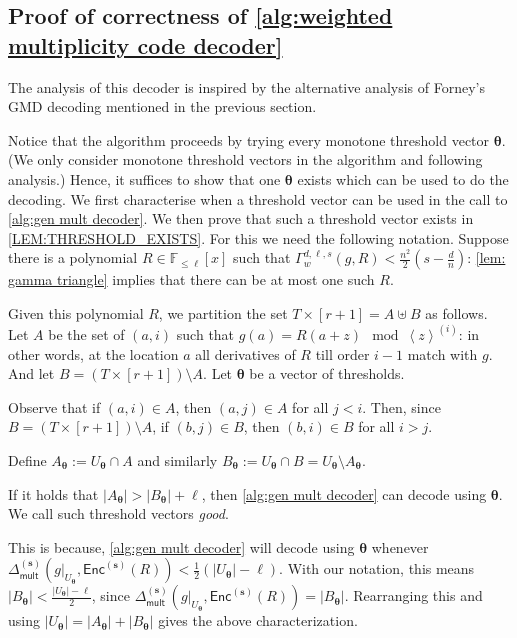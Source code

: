 \documentclass{article}
\def\Field{\mathbb{F}}
\let\F\Field
\def\abs#1{\left| #1 \right|}
\newcommand{\ip}[1]{\left\langle #1 \right\rangle}
\newcommand{\enc}{{\mathsf{Enc}}}
\newcommand{\Delm}{\Delta_{\mathsf{mult}}}
\newcommand{\sbar}{\mathbf{s}}
\newcommand{\thetabar}{{\boldsymbol{\theta}}}
\begin{document}
	\subsection{Proof of correctness of \texorpdfstring{\cref{alg:weighted multiplicity code decoder}}{Algorithm 2}}
	
	The analysis of this decoder is inspired by the alternative analysis of
	Forney's GMD decoding mentioned in the previous section. 
	
	Notice that the algorithm proceeds by trying every monotone threshold vector
	$\thetabar$. (We only consider monotone threshold vectors in the algorithm and following analysis.) Hence, it suffices to show that one $\thetabar$ exists
	which can be used to do the decoding. We first characterise when a
	threshold vector can be used in the call to \cref{alg:gen mult
		decoder}. We then prove that such a threshold vector exists  in \cref{LEM:THRESHOLD_EXISTS}. For this we need the following notation. 
	Suppose there is a polynomial $R \in \F_{\leq \ell}[x]$ such that
	$\Gamma_w^{d, \ell, s}(g, R) < \frac{n^2}{2}(s-\frac{d}{n})$:
	\cref{lem: gamma triangle} implies that there can be at most one such
	$R$. 
	
	Given this polynomial $R$, we partition the set $T \times [r+1] = A
	\uplus B$ as follows. Let $A$ be the set of $(a,i)$ such
	that $g(a)=R(a+z) \mod \ip{z}^{(i)}$: in other words, at the
	location $a$ all derivatives of $R$ till order $i-1$ match with $g$. And
	let $B = (T\times [r+1]) \setminus A$. Let ${\thetabar}$ be a vector of
	thresholds. 
	
	Observe that if $(a, i) \in A$, then $(a, j) \in A$ for all $j < i$. Then, since $B = (T\times [r+1]) \setminus A$, if $(b, j) \in B$, then $(b, i) \in B$ for all $i > j$. 
	
	Define $A_\thetabar := U_\thetabar \cap A$ and similarly
	$B_\thetabar := U_\thetabar \cap B = U_\thetabar \setminus A_\thetabar$.
	
	\begin{observation}\label{obs:decodable}
		If it holds that $ \abs{A_{\thetabar}} > \abs{B_{\thetabar}} + \ell $, then \cref{alg:gen mult decoder} can decode using ${\thetabar}$. We call such threshold vectors \emph{good}. 
	\end{observation}
	
	This is because, \cref{alg:gen mult decoder} will decode using $\thetabar$ whenever  $\Delm^{(\sbar)}(g|_{U_{\thetabar}},\enc^{(\sbar)}(R)) < \frac{1}{2} (|U_{\thetabar}| - \ell)$.
	With our notation, this means $\abs{B_{{\thetabar}}} < \frac{\abs{U_{\thetabar}}-\ell}{2}$, since $\Delm^{(\sbar)}(g|_{U_{\thetabar}},\enc^{(\sbar)}(R)) = \abs{B_{{\thetabar}}}$.
	Rearranging this and using $\abs{U_{\thetabar}} = \abs{A_{\thetabar}}+\abs{B_{\thetabar}}$ gives the above characterization.
	
\end{document}
